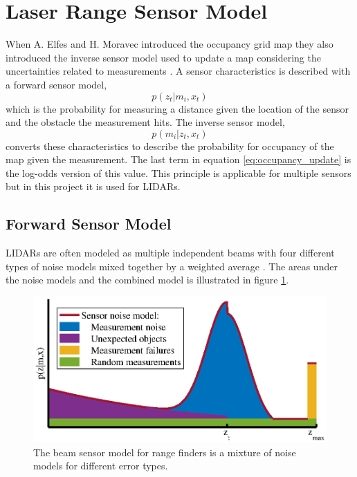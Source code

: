 \section{Laser Range Sensor Model}
\label{sec:laser_range_sensor}
When A. Elfes and H. Moravec introduced the occupancy grid map they also introduced the inverse sensor model used to update a map considering the uncertainties related to measurements \cite{elfesMoravecOccGrid}. 
A sensor characteristics is described with a forward sensor model, 
\begin{equation*}
	p(z_t|m_i,x_t)
\end{equation*}
which is the probability for measuring a distance given the location of the sensor and the obstacle the measurement hits. 
The inverse sensor model,
\begin{equation*}
	p(m_i|z_t,x_t)
\end{equation*}
converts these characteristics to describe the probability for occupancy of the map given the measurement. The last term in equation \vref{eq:occupancy_update} is the log-odds version of this value.
This principle is applicable for multiple sensors but in this project it is used for LIDARs. 


\subsection{Forward Sensor Model}
LIDARs are often modeled as multiple independent beams with four different types of noise models mixed together by a weighted average \cite{probRob}.
The areas under the noise models and the combined model is illustrated in figure \ref{fig:sensor_noise_model}.
\begin{figure}
\centering
\includegraphics[scale=1]{chapters/static_mapping/figures/sensor_noise_model}
\caption{The beam sensor model for range finders is a mixture of noise models for different error types.}
\label{fig:sensor_noise_model}
\end{figure}

